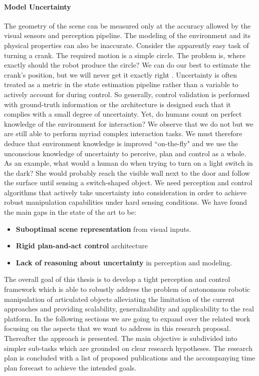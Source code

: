 \paragraph{Model Uncertainty} The geometry of the scene can be measured only at the accuracy allowed by the visual sensors and perception pipeline. The modeling of the environment and its physical properties can also be inaccurate. Consider the apparently easy task of turning a crank. The required motion is a simple circle. The problem is, where exactly should the robot produce the circle? We can do our best to estimate the crank’s position, but we will never get it exactly right \citep{mason2018toward}. Uncertainty is often treated as a metric in the state estimation pipeline rather than a variable to actively account for during control. So generally, control validation is performed with ground-truth information or the architecture is designed such that it complies with a small degree of uncertainty. Yet, do humans count on perfect knowledge of the environment for interaction? We observe that we do not but we are still able to perform myriad complex interaction tasks. We must therefore deduce that environment knowledge is improved ``on-the-fly" and we use the unconscious knowledge of uncertainty to perceive, plan and control as a whole. As an example, what would a human do when trying to turn on a light switch in the dark? She would probably reach the visible wall next to the door and follow the surface until sensing a switch-shaped object. We need perception and control algorithms that actively take uncertainty into consideration in order to achieve robust manipulation capabilities under hard sensing conditions.   
\medskip 
\newline
We have found the main gaps in the state of the art to be:
\begin{itemize}
\item \textbf{Suboptimal scene representation} from visual inputs.
\item \textbf{Rigid plan-and-act control} architecture
\item \textbf{Lack of reasoning about uncertainty} in perception and modeling. 
\end{itemize}


The overall goal of this thesis is to develop a tight perception and control framework which is able to robustly address the problem of autonomous robotic manipulation of articulated objects alleviating the limitation of the current approaches and providing scalability, generalizability and applicability to the real platform. In the following sections we are going to expand over the related work focusing on the aspects that we want to address in this research proposal. Thereafter the approach is presented. The main objective is subdivided into simpler sub-tasks which are grounded on clear research hypotheses. The research plan is concluded with a list of proposed publications and the accompanying time plan forecast to achieve the intended goals. 
